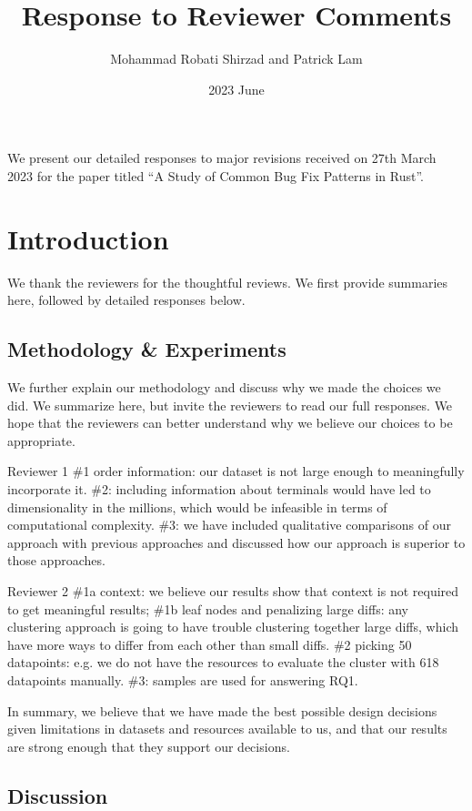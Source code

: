 \documentclass{article}
\title{Response to Reviewer Comments}
\date{2023 June}
\author{Mohammad Robati Shirzad and Patrick Lam}
\begin{document}
\maketitle

We present our detailed responses to major revisions received on 27th March 2023 for the paper titled ``A Study of Common Bug Fix Patterns in Rust''.

\section{Introduction}

We thank the reviewers for the thoughtful reviews. We first provide summaries here, followed by detailed responses below.

\subsection{Methodology \& Experiments}

We further explain our methodology and discuss why we made the choices we did. We summarize here, but invite the reviewers to read our full responses. We hope that the reviewers can better understand why we believe our choices to be appropriate.

Reviewer 1 \#1 order information: our dataset is not large enough to meaningfully incorporate it. \#2: including information about terminals would have led to dimensionality in the millions, which would be infeasible in terms of computational complexity. \#3: we have included qualitative comparisons of our approach with previous approaches and discussed how our approach is superior to those approaches.

Reviewer 2 \#1a context: we believe our results show that context is not required to get meaningful results; \#1b leaf nodes and penalizing large diffs: any clustering approach is going to have trouble clustering together large diffs, which have more ways to differ from each other than small diffs. \#2 picking 50 datapoints: e.g. we do not have the resources to evaluate the cluster with 618 datapoints manually. \#3: samples are used for answering RQ1.

In summary, we believe that we have made the best possible design decisions given limitations in datasets and resources available to us, and that our results are strong enough that they support our decisions.

\subsection{Discussion}
\end{document}
